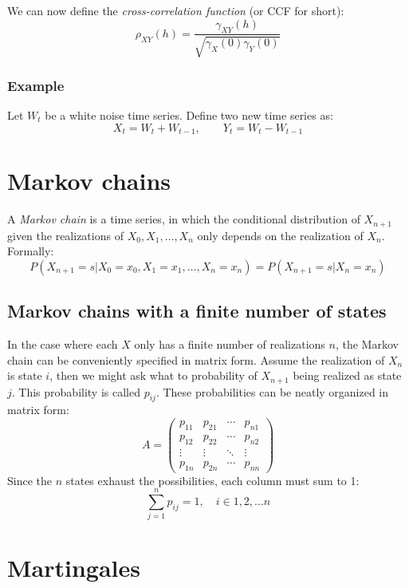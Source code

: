 \documentclass[12pt, a4paper]{article}
\numberwithin{equation}{section}
\begin{document}
We can now define the \textit{cross-correlation function} (or CCF for short):
\begin{equation}
\rho_{XY}(h)=\frac{\gamma_{XY}(h)}{\sqrt{\gamma_X(0)\gamma_Y(0)}}
\end{equation}

\subsubsection{Example}
Let $W_t$ be a white noise time series. Define two new time series as:
\begin{equation}
X_t=W_t+W_{t-1},\qquad Y_t=W_t-W_{t-1}
\end{equation}

\section{Markov chains}
A \textit{Markov chain} is a time series, in which the conditional distribution of $X_{n+1}$ given the realizations of $X_0, X_1,\ldots, X_n$ only depends on the realization of $X_n$. Formally:
\begin{equation}
P(X_{n+1}=s|X_0=x_0, X_1=x_1,\ldots, X_n=x_n)=P(X_{n+1}=s|X_n=x_n)
\end{equation}

\subsection{Markov chains with a finite number of states}
In the case where each $X$ only has a finite number of realizations $n$, the Markov chain can be conveniently specified in matrix form. Assume the realization of $X_n$ is state $i$, then we might ask what to probability of $X_{n+1}$ being realized as state $j$. This probability is called $p_{ij}$. These probabilities can be neatly organized in matrix form:
\begin{equation}
A=\begin{pmatrix}
p_{11}	& p_{21}	& \cdots	& p_{n1} \\
p_{12}	& p_{22}	& \cdots	& p_{n2} \\
\vdots	& \vdots	& \ddots	& \vdots \\
p_{1n}	& p_{2n}	& \cdots	& p_{nn}
\end{pmatrix}
\end{equation}
Since the $n$ states exhaust the possibilities, each column must sum to 1:
\begin{equation}
\sum_{j=1}^n p_{ij}=1,\quad i\in{1,2,\ldots n}
\end{equation}

\section{Martingales}
\end{document}
